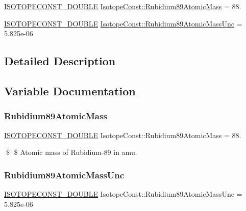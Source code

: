 \begin{DoxyCompactItemize}
\item 
\mbox{\hyperlink{group___isotope_const-_macros_ga8f45a7272ce02c0b4c65c44636ed719a}{I\+S\+O\+T\+O\+P\+E\+C\+O\+N\+S\+T\+\_\+\+D\+O\+U\+B\+LE}} \mbox{\hyperlink{group___isotope_const-_rubidium-_rb89_gaa090ecdcd6c3d83570f1094b88896be9}{Isotope\+Const\+::\+Rubidium89\+Atomic\+Mass}} = 88.
\item 
\mbox{\hyperlink{group___isotope_const-_macros_ga8f45a7272ce02c0b4c65c44636ed719a}{I\+S\+O\+T\+O\+P\+E\+C\+O\+N\+S\+T\+\_\+\+D\+O\+U\+B\+LE}} \mbox{\hyperlink{group___isotope_const-_rubidium-_rb89_gab27929b4c824dceed657a480d421bd0d}{Isotope\+Const\+::\+Rubidium89\+Atomic\+Mass\+Unc}} = 5.\+825e-\/06
\end{DoxyCompactItemize}


\subsection{Detailed Description}


\subsection{Variable Documentation}
\mbox{\label{group___isotope_const-_rubidium-_rb89_gaa090ecdcd6c3d83570f1094b88896be9}} 
\subsubsection{\texorpdfstring{Rubidium89\+Atomic\+Mass}{Rubidium89AtomicMass}}
{\footnotesize\ttfamily \mbox{\hyperlink{group___isotope_const-_macros_ga8f45a7272ce02c0b4c65c44636ed719a}{I\+S\+O\+T\+O\+P\+E\+C\+O\+N\+S\+T\+\_\+\+D\+O\+U\+B\+LE}} Isotope\+Const\+::\+Rubidium89\+Atomic\+Mass = 88.}

\$ \$ Atomic mass of Rubidium-\/89 in amu. \mbox{\label{group___isotope_const-_rubidium-_rb89_gab27929b4c824dceed657a480d421bd0d}} 
\subsubsection{\texorpdfstring{Rubidium89\+Atomic\+Mass\+Unc}{Rubidium89AtomicMassUnc}}
{\footnotesize\ttfamily \mbox{\hyperlink{group___isotope_const-_macros_ga8f45a7272ce02c0b4c65c44636ed719a}{I\+S\+O\+T\+O\+P\+E\+C\+O\+N\+S\+T\+\_\+\+D\+O\+U\+B\+LE}} Isotope\+Const\+::\+Rubidium89\+Atomic\+Mass\+Unc = 5.\+825e-\/06}

